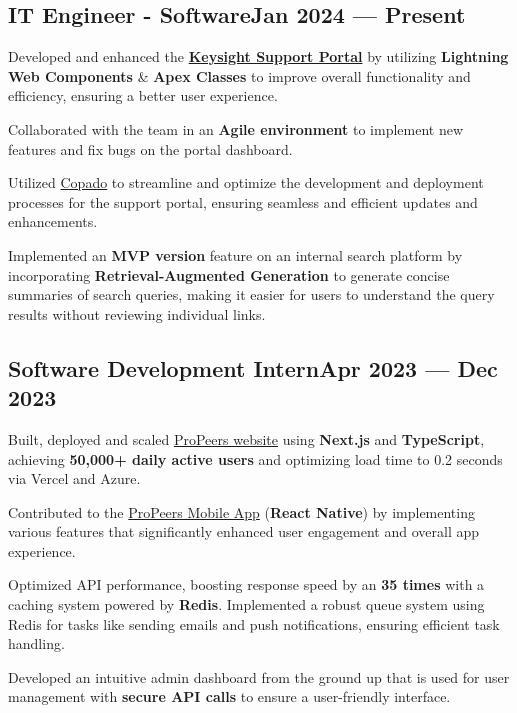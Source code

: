 \subsection{{IT Engineer - Software\hfill Jan 2024 --- Present}}
\begin{zitemize}
\item Developed and enhanced the \textbf{\href{https://support.keysight.com/s}{Keysight Support Portal}} by utilizing \textbf{Lightning Web Components} \& \textbf{Apex Classes} to improve overall functionality and efficiency, ensuring a better user experience.
\item Collaborated with the team in an \textbf{Agile environment} to implement new features and fix bugs on the portal dashboard.
\item Utilized \href{https://www.copado.com}{Copado} to streamline and optimize the development and deployment processes for the support portal, ensuring seamless and efficient updates and enhancements.
\item Implemented an \textbf{MVP version} feature on an internal search platform by incorporating \textbf{Retrieval-Augmented Generation} to generate concise summaries of search queries, making it easier for users to understand the query results without reviewing individual links.
\end{zitemize}

\subsection{{Software Development Intern\hfill Apr 2023 --- Dec 2023}}
\begin{zitemize}
\item Built, deployed and scaled \href{https://www.propeers.in}{ProPeers website} using \textbf{Next.js} and \textbf{TypeScript}, achieving \textbf{50,000+ daily active users} and optimizing load time to 0.2 seconds via Vercel and Azure.
\item Contributed to the {\href{https://play.google.com/store/apps/details?id=com.wireless.propeers}{ProPeers Mobile App}} (\textbf{React Native}) by implementing various features that significantly enhanced user engagement and overall app experience.
\item Optimized API performance, boosting response speed by an \textbf{35 times} with a caching system powered by \textbf{Redis}. Implemented a robust queue system using Redis for tasks like sending emails and push notifications, ensuring efficient task handling.
\item Developed an intuitive admin dashboard from the ground up that is used for user management with \textbf{secure API calls} to ensure a user-friendly interface.
\end{zitemize}

